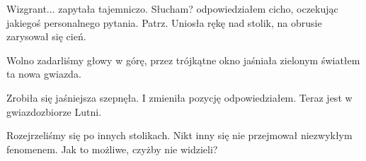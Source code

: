\begin{dialogue}
	\ds{} Wizgrant... \dm{} zapytała tajemniczo.
	\ds{} Słucham? \dm{} odpowiedziałem cicho, oczekując jakiegoś personalnego pytania.
	\ds{} Patrz. \dm{} Uniosła rękę nad stolik, na obrusie zarysował się cień.
\end{dialogue}

Wolno zadarliśmy głowy w górę, przez trójkątne okno jaśniała zielonym światłem ta nowa gwiazda.

\begin{dialogue}
	\ds{} Zrobiła się jaśniejsza \dm{} szepnęła.
	\ds{} I zmieniła pozycję \dm{} odpowiedziałem. \dm{} Teraz jest w gwiazdozbiorze Lutni.
\end{dialogue}

Rozejrzeliśmy się po innych stolikach. Nikt inny się nie przejmował niezwykłym fenomenem.
Jak to możliwe, czyżby nie widzieli?












